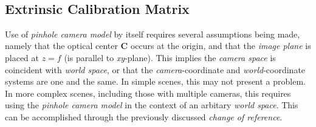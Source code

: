 \begin{equation*}
\begin{split}
\end{split}
\end{equation*}%



\subsection{Extrinsic Calibration Matrix}

\par Use of \textit{pinhole camera model} by itself requires several assumptions being made, namely that the optical center $\mathbf{C}$ occurs at the origin, and that the \textit{image plane} is placed at $z=f$ (is parallel to \textit{xy}-plane). This implies the \textit{camera space} is coincident with \textit{world space}, or that the \textit{camera}-coordinate and \textit{world}-coordinate systems are one and the same. In simple scenes, this may not present a problem. In more complex scenes, including those with multiple cameras, this requires using the \textit{pinhole camera model} in the context of an arbitary \textit{world space}. This can be accomplished through the previously discussed \textit{change of reference}.
 
